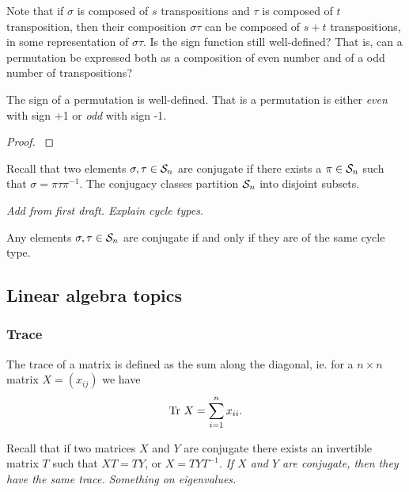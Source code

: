 Note that if $\sigma$ is composed of $s$ transpositions and $\tau$ is composed of $t$ transposition, then their composition $\sigma\tau$ can be composed of $s+t$ transpositions, in some representation of $\sigma\tau$. Is the sign function still well-defined? That is, can a permutation be expressed both as a composition of even number and of a odd number of transpositions?

\begin{proposition}\label{prop:signwelldefined}
	The sign of a permutation is well-defined. That is a permutation is either \textit{even} with sign +1 or \textit{odd} with sign -1.
\end{proposition}
\begin{proof}
	\cite[Thm.12.6.1.]{Biggs}
\end{proof}

Recall that two elements $\sigma, \tau \in \mathcal{S}_n$ are conjugate if there exists a $\pi \in \mathcal{S}_n$ such that $\sigma = \pi \tau \pi^{-1}$. The conjugacy classes partition $\mathcal{S}_n$ into disjoint subsets. 

\textit{Add from first draft. Explain cycle types.}

\begin{proposition}\cite[Thm.?.?.]{Sagan}
	Any elements $\sigma, \tau \in \mathcal{S}_n$ are conjugate if and only if they are of the same cycle type.
\end{proposition}





\subsection{Linear algebra topics}

	\subsubsection{Trace}
		
		The trace of a matrix is defined as the sum along the diagonal, ie. for a $n \times n$ matrix $X = (x_{ij})$ we have
		\begin{align*}
			\text{Tr } X = \sum_{i=1}^{n} x_{ii}.
		\end{align*}
		
		Recall that if two matrices $X$ and $Y$ are conjugate there exists an invertible matrix $T$ such that $XT = TY$, or $X = TYT^{-1}$. \textit{If $X$ and $Y$ are conjugate, then they have the same trace.} \textit{Something on eigenvalues.}

